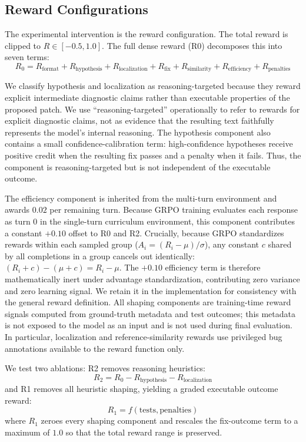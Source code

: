 \documentclass{article}
\begin{document}
\subsection{Reward Configurations}
The experimental intervention is the reward configuration. The total reward is clipped to $R \in [-0.5, 1.0]$. The full dense reward (R0) decomposes this into seven terms:
\begin{equation}
R_0 = R_{\text{format}} + R_{\text{hypothesis}} + R_{\text{localization}} + R_{\text{fix}} + R_{\text{similarity}} + R_{\text{efficiency}} + R_{\text{penalties}}
\end{equation}

We classify hypothesis and localization as reasoning-targeted because they reward explicit intermediate diagnostic claims rather than executable properties of the proposed patch. We use ``reasoning-targeted'' operationally to refer to rewards for explicit diagnostic claims, not as evidence that the resulting text faithfully represents the model's internal reasoning. The hypothesis component also contains a small confidence-calibration term: high-confidence hypotheses receive positive credit when the resulting fix passes and a penalty when it fails. Thus, the component is reasoning-targeted but is not independent of the executable outcome.

The efficiency component is inherited from the multi-turn environment and awards $0.02$ per remaining turn. Because GRPO training evaluates each response as turn 0 in the single-turn curriculum environment, this component contributes a constant $+0.10$ offset to R0 and R2. Crucially, because GRPO standardizes rewards within each sampled group ($A_i = (R_i - \mu)/\sigma$), any constant $c$ shared by all completions in a group cancels out identically: $(R_i + c) - (\mu + c) = R_i - \mu$. The $+0.10$ efficiency term is therefore mathematically inert under advantage standardization, contributing zero variance and zero learning signal. We retain it in the implementation for consistency with the general reward definition. All shaping components are training-time reward signals computed from ground-truth metadata and test outcomes; this metadata is not exposed to the model as an input and is not used during final evaluation. In particular, localization and reference-similarity rewards use privileged bug annotations available to the reward function only.

We test two ablations: R2 removes reasoning heuristics:
\begin{equation}
R_2 = R_0 - R_{\text{hypothesis}} - R_{\text{localization}}
\end{equation}
and R1 removes all heuristic shaping, yielding a graded executable outcome reward:
\begin{equation}
R_1 = f(\text{tests}, \text{penalties})
\end{equation}
where $R_1$ zeroes every shaping component and rescales the fix-outcome term to a maximum of $1.0$ so that the total reward range is preserved.
\end{document}
